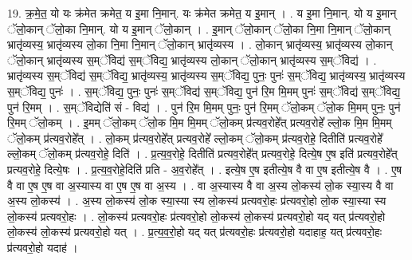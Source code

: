 \documentclass[17pt]{extarticle}
\begin{document}
19. क्र॒मे॒त॒ यो यः क्र॑मेत क्रमेत॒ य इ॒मा नि॒मान्. यः क्र॑मेत क्रमेत॒ य इ॒मान् । . य इ॒मा नि॒मान्. यो य इ॒मान् ॅलो॒कान् ॅलो॒का नि॒मान्. यो य इ॒मान् ॅलो॒कान् । . इ॒मान् ॅलो॒कान् ॅलो॒का नि॒मा नि॒मान् ॅलो॒कान् भ्रातृ॑व्यस्य॒ भ्रातृ॑व्यस्य लो॒का नि॒मा नि॒मान् ॅलो॒कान् भ्रातृ॑व्यस्य । . लो॒कान् भ्रातृ॑व्यस्य॒ भ्रातृ॑व्यस्य लो॒कान् ॅलो॒कान् भ्रातृ॑व्यस्य स॒म्ॅविद्य॑ स॒म्ॅविद्य॒ भ्रातृ॑व्यस्य लो॒कान् ॅलो॒कान् भ्रातृ॑व्यस्य स॒म्ॅविद्य॑ । . भ्रातृ॑व्यस्य स॒म्ॅविद्य॑ स॒म्ॅविद्य॒ भ्रातृ॑व्यस्य॒ भ्रातृ॑व्यस्य स॒म्ॅविद्य॒ पुनः॒ पुनः॑ स॒म्ॅविद्य॒ भ्रातृ॑व्यस्य॒ भ्रातृ॑व्यस्य स॒म्ॅविद्य॒ पुनः॑ । . स॒म्ॅविद्य॒ पुनः॒ पुनः॑ स॒म्ॅविद्य॑ स॒म्ॅविद्य॒ पुन॑ रि॒म मि॒मम् पुनः॑ स॒म्ॅविद्य॑ स॒म्ॅविद्य॒ पुन॑ रि॒मम् । . स॒म्ॅविद्येति॑ सं - विद्य॑ । . पुन॑ रि॒म मि॒मम् पुनः॒ पुन॑ रि॒मम् ॅलो॒कम् ॅलो॒क मि॒मम् पुनः॒ पुन॑ रि॒मम् ॅलो॒कम् । . इ॒मम् ॅलो॒कम् ॅलो॒क मि॒म मि॒मम् ॅलो॒कम् प्र॑त्यव॒रोहे᳚त् प्रत्यव॒रोहे᳚ ल्लो॒क मि॒म मि॒मम् ॅलो॒कम् प्र॑त्यव॒रोहे᳚त् । . लो॒कम् प्र॑त्यव॒रोहे᳚त् प्रत्यव॒रोहे᳚ ल्लो॒कम् ॅलो॒कम् प्र॑त्यव॒रोहे॒ दितीति॑ प्रत्यव॒रोहे᳚ ल्लो॒कम् ॅलो॒कम् प्र॑त्यव॒रोहे॒ दिति॑ । . प्र॒त्य॒व॒रोहे॒ दितीति॑ प्रत्यव॒रोहे᳚त् प्रत्यव॒रोहे॒ दित्ये॒ष ए॒ष इति॑ प्रत्यव॒रोहे᳚त् प्रत्यव॒रोहे॒ दित्ये॒षः । . प्र॒त्य॒व॒रोहे॒दिति॑ प्रति - अ॒व॒रोहे᳚त् । . इत्ये॒ष ए॒ष इतीत्ये॒ष वै वा ए॒ष इतीत्ये॒ष वै । . ए॒ष वै वा ए॒ष ए॒ष वा अ॒स्यास्य वा ए॒ष ए॒ष वा अ॒स्य । . वा अ॒स्यास्य वै वा अ॒स्य लो॒कस्य॑ लो॒क स्या॒स्य वै वा अ॒स्य लो॒कस्य॑ । . अ॒स्य लो॒कस्य॑ लो॒क स्या॒स्या स्य लो॒कस्य॑ प्रत्यवरो॒हः प्र॑त्यवरो॒हो लो॒क स्या॒स्या स्य लो॒कस्य॑ प्रत्यवरो॒हः । . लो॒कस्य॑ प्रत्यवरो॒हः प्र॑त्यवरो॒हो लो॒कस्य॑ लो॒कस्य॑ प्रत्यवरो॒हो यद् यत् प्र॑त्यवरो॒हो लो॒कस्य॑ लो॒कस्य॑ प्रत्यवरो॒हो यत् । . प्र॒त्य॒व॒रो॒हो यद् यत् प्र॑त्यवरो॒हः प्र॑त्यवरो॒हो यदाहाह॒ यत् प्र॑त्यवरो॒हः प्र॑त्यवरो॒हो यदाह॑ । \newline
\end{document}
